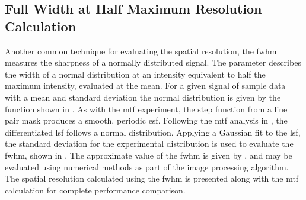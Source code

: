 \documentclass[../../../main.tex]{subfiles}%
\begin{document}
%
    \subsection{Full Width at Half Maximum Resolution Calculation}%
    \label{sec:chapter-3:imaging-techniques:fwhm-resolution}%
    Another common technique for evaluating the spatial resolution, the \gls{fwhm} measures the sharpness of a normally distributed signal.
    The parameter describes the width of a normal distribution at an intensity equivalent to half the maximum intensity, evaluated at the mean.
    For a given signal of sample data  with a mean  and standard deviation \Xvariable{\sigma} the normal distribution is given by the function  shown in . 
    As with the \gls{mtf} experiment, the step function from a line pair mask produces a smooth, periodic \gls{esf}.
    Following the \gls{mtf} analysis in , the differentiated \gls{lsf} follows a normal distribution.
    Applying a Gaussian fit to the \gls{lsf}, the standard deviation for the experimental distribution is used to evaluate the \gls{fwhm}, shown in .
    The approximate value of the \gls{fwhm} is given by , and may be evaluated using numerical methods as part of the image processing algorithm.
    The spatial resolution calculated using the \gls{fwhm} is presented along with the \gls{mtf} calculation for complete performance comparison.
\end{document}
